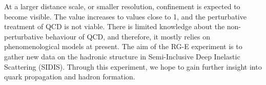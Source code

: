 At a larger distance scale, or smaller resolution, confinement is expected to become visible.
The \textalpha value increases to values close to 1, and the perturbative treatment of QCD is not viable.
There is limited knowledge about the non-perturbative behaviour of QCD, and therefore, it mostly relies on phenomenological models at present.
The aim of the RG-E experiment is to gather new data on the hadronic structure in Semi-Inclusive Deep Inelastic Scattering (SIDIS).
Through this experiment, we hope to gain further insight into quark propagation and hadron formation.
